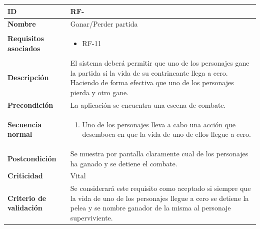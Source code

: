 \begin{center}
	\begin{tabular}{ | p{4.7cm} | p{10cm} | } 
		\hline
		
		\textbf{ID} & RF-\arabic{contador_requisitos_funcionales}
		{contador_requisitos_funcionales} \\
		
		\hline 
		\textbf{Nombre} &
		Ganar/Perder partida\\ 
		
		\hline
		\textbf{Requisitos asociados} & 
		\begin{itemize}
			\item RF-11
		\end{itemize}\\
		
		\hline
		\textbf{Descripción} & 
		El sistema deberá permitir que uno de los personajes gane la partida si la vida de su contrincante llega a cero. Haciendo de forma efectiva que uno de los personajes pierda y otro gane.\\
		
		\hline
		\textbf{Precondición} & 
		La aplicación se encuentra una escena de combate.\\
		
		\hline
		\textbf{Secuencia normal} &
		\begin{enumerate}
			\item Uno de los personajes lleva a cabo una acción que desemboca en que la vida de uno de ellos llegue a cero.
		\end{enumerate}
		\\
		
		\hline
		\textbf{Postcondición} & 
		Se muestra por pantalla claramente cual de los personajes ha ganado y se detiene el combate.\\
		
		\hline 
		\textbf{Criticidad} &
		Vital\\
		
		\hline 
		\textbf{Criterio de validación} & 
		Se considerará este requisito como aceptado si siempre que la vida de uno de los personajes llegue a cero se detiene la pelea y se nombre ganador de la misma al personaje superviviente.\\
		
		\hline
	\end{tabular}
\end{center}

